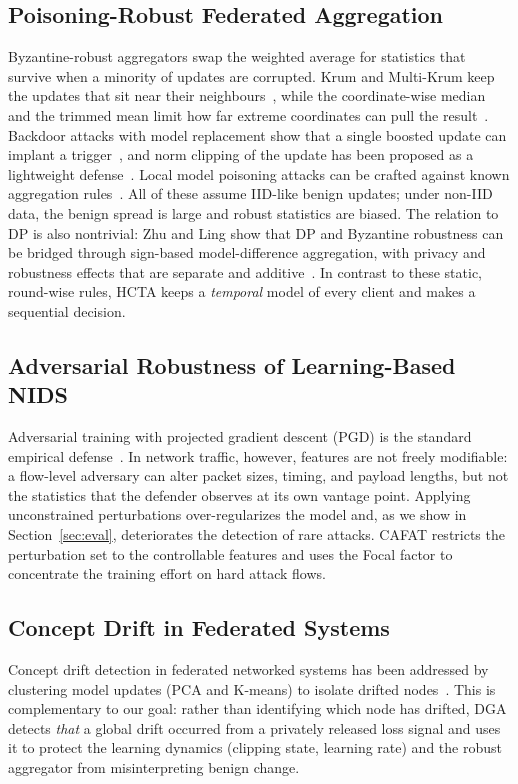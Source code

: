 \documentclass[journal]{IEEEtran}
\begin{document}
\subsection{Poisoning-Robust Federated Aggregation}
Byzantine-robust aggregators swap the weighted average for statistics that survive when a minority of updates are corrupted. Krum and Multi-Krum keep the updates that sit near their neighbours~\cite{krum}, while the coordinate-wise median and the trimmed mean limit how far extreme coordinates can pull the result~\cite{yin}. Backdoor attacks with model replacement show that a single boosted update can implant a trigger~\cite{bagdasaryan}, and norm clipping of the update has been proposed as a lightweight defense~\cite{sun}. Local model poisoning attacks can be crafted against known aggregation rules~\cite{fang}. All of these assume IID-like benign updates; under non-IID data, the benign spread is large and robust statistics are biased. The relation to DP is also nontrivial: Zhu and Ling show that DP and Byzantine robustness can be bridged through sign-based model-difference aggregation, with privacy and robustness effects that are separate and additive~\cite{zhu_ling}. In contrast to these static, round-wise rules, HCTA keeps a \emph{temporal} model of every client and makes a sequential decision.

\subsection{Adversarial Robustness of Learning-Based NIDS}
Adversarial training with projected gradient descent (PGD) is the standard empirical defense~\cite{madry}. In network traffic, however, features are not freely modifiable: a flow-level adversary can alter packet sizes, timing, and payload lengths, but not the statistics that the defender observes at its own vantage point. Applying unconstrained perturbations over-regularizes the model and, as we show in Section~\ref{sec:eval}, deteriorates the detection of rare attacks. CAFAT restricts the perturbation set to the controllable features and uses the Focal factor to concentrate the training effort on hard attack flows.

\subsection{Concept Drift in Federated Systems}
Concept drift detection in federated networked systems has been addressed by clustering model updates (PCA and K-means) to isolate drifted nodes~\cite{manias}. This is complementary to our goal: rather than identifying which node has drifted, DGA detects \emph{that} a global drift occurred from a privately released loss signal and uses it to protect the learning dynamics (clipping state, learning rate) and the robust aggregator from misinterpreting benign change.
\end{document}
